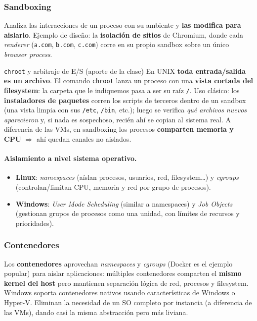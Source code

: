 \documentclass[11pt,a4paper]{article}
\begin{document}
\subsubsection{Sandboxing}
Analiza las interacciones de un proceso con su ambiente y \textbf{las modifica para aislarlo}.
Ejemplo de diseño: la \textbf{isolación de sitios} de Chromium, donde cada \emph{renderer}
(\texttt{a.com}, \texttt{b.com}, \texttt{c.com}) corre en su propio sandbox sobre un único
\emph{browser process}.

\begin{practbox}{\texttt{chroot} y arbitraje de E/S (aporte de la clase)}
En UNIX \textbf{toda entrada/salida es un archivo}. El comando \texttt{chroot} lanza un proceso
con una \textbf{vista cortada del filesystem}: la carpeta que le indiquemos pasa a ser su raíz
\texttt{/}. Uso clásico: los \textbf{instaladores de paquetes} corren los scripts de terceros
dentro de un sandbox (una vista limpia con sus \texttt{/etc}, \texttt{/bin}, etc.); luego se
verifica \emph{qué archivos nuevos aparecieron} y, si nada es sospechoso, recién ahí se copian
al sistema real. A diferencia de las VMs, en sandboxing los procesos \textbf{comparten memoria y
CPU} $\Rightarrow$ ahí quedan canales no aislados.
\end{practbox}

\paragraph{Aislamiento a nivel sistema operativo.}
\begin{itemize}[leftmargin=1.4em,itemsep=1pt]
  \item \textbf{Linux}: \emph{namespaces} (aíslan procesos, usuarios, red, filesystem\dots) y
        \emph{cgroups} (controlan/limitan CPU, memoria y red por grupo de procesos).
  \item \textbf{Windows}: \emph{User Mode Scheduling} (similar a namespaces) y \emph{Job Objects}
        (gestionan grupos de procesos como una unidad, con límites de recursos y prioridades).
\end{itemize}

\subsubsection{Contenedores}
Los \textbf{contenedores} aprovechan \emph{namespaces} y \emph{cgroups} (Docker es el ejemplo
popular) para aislar aplicaciones: múltiples contenedores comparten el \textbf{mismo kernel del
host} pero mantienen separación lógica de red, procesos y filesystem. Windows soporta
contenedores nativos usando características de Windows o Hyper-V. Eliminan la necesidad de un
SO completo por instancia (a diferencia de las VMs), dando casi la misma abstracción pero más
liviana.
\end{document}
